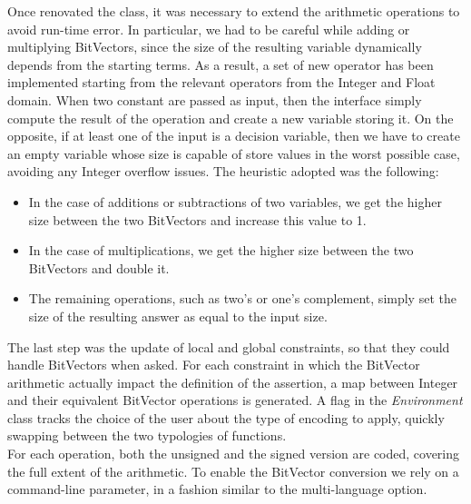 Once renovated the class, it was necessary to extend the arithmetic operations to avoid run-time error. In particular, we had to be careful while adding or multiplying BitVectors, since the size of the resulting variable dynamically depends from the starting terms. As a result, a set of new operator has been implemented starting from the relevant operators from the Integer and Float domain. When two constant are passed as input, then the interface simply compute the result of the operation and create a new variable storing it. On the opposite, if at least one of the input is a decision variable, then we have to create an empty variable whose size is capable of store values in the worst possible case, avoiding any Integer overflow issues. The heuristic adopted was the following:

\begin{itemize}
    \item In the case of additions or subtractions of two variables, we get the higher size between the two BitVectors and increase this value to 1.
    \item In the case of multiplications, we get the higher size between the two BitVectors and double it.
    \item The remaining operations, such as two's or one's complement, simply set the size of the resulting answer as equal to the input size.
\end{itemize}

The last step was the update of local and global constraints, so that they could handle BitVectors when asked. For each constraint in which the BitVector arithmetic actually impact the definition of the assertion, a map between Integer and their equivalent BitVector operations is generated. A flag in the \textit{Environment} class tracks the choice of the user about the type of encoding to apply, quickly swapping between the two typologies of functions. \\
For each operation, both the unsigned and the signed version are coded, covering the full extent of the arithmetic.
To enable the BitVector conversion we rely on a command-line parameter, in a fashion similar to the multi-language option. 

\newpage
